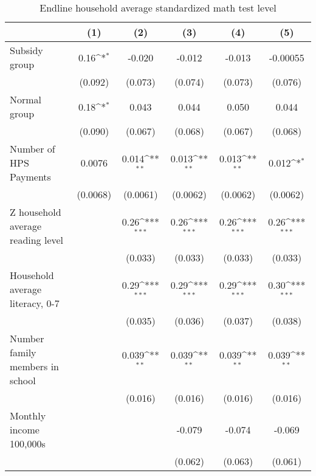 \begin{table}[htbp]\centering
\def\sym#1{\ifmmode^{#1}\else\(^{#1}\)\fi}
\caption{Endline household average standardized math test level}
\begin{tabular*}{1\hsize}{@{\hskip\tabcolsep\extracolsep\fill}l*{5}{c}}
\toprule
                &\multicolumn{1}{c}{(1)}         &\multicolumn{1}{c}{(2)}         &\multicolumn{1}{c}{(3)}         &\multicolumn{1}{c}{(4)}         &\multicolumn{1}{c}{(5)}         \\
\midrule
Subsidy group   &     0.16\sym{*}  &   -0.020         &   -0.012         &   -0.013         & -0.00055         \\
                &  (0.092)         &  (0.073)         &  (0.074)         &  (0.073)         &  (0.076)         \\
Normal group    &     0.18\sym{*}  &    0.043         &    0.044         &    0.050         &    0.044         \\
                &  (0.090)         &  (0.067)         &  (0.068)         &  (0.067)         &  (0.068)         \\
Number of HPS Payments&   0.0076         &    0.014\sym{**} &    0.013\sym{**} &    0.013\sym{**} &    0.012\sym{*}  \\
                & (0.0068)         & (0.0061)         & (0.0062)         & (0.0062)         & (0.0062)         \\
Z household average reading level&                  &     0.26\sym{***}&     0.26\sym{***}&     0.26\sym{***}&     0.26\sym{***}\\
                &                  &  (0.033)         &  (0.033)         &  (0.033)         &  (0.033)         \\
Household average literacy, 0-7&                  &     0.29\sym{***}&     0.29\sym{***}&     0.29\sym{***}&     0.30\sym{***}\\
                &                  &  (0.035)         &  (0.036)         &  (0.037)         &  (0.038)         \\
Number family members in school&                  &    0.039\sym{**} &    0.039\sym{**} &    0.039\sym{**} &    0.039\sym{**} \\
                &                  &  (0.016)         &  (0.016)         &  (0.016)         &  (0.016)         \\
Monthly income 100,000s&                  &                  &   -0.079         &   -0.074         &   -0.069         \\
                &                  &                  &  (0.062)         &  (0.063)         &  (0.061)         \\

\end{tabular*}
\end{table}
